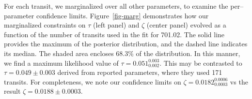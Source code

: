 %
%
For each transit, we marginalized over all other parameters, to
examine the per--parameter confidence limits.  Figure~\ref{fig-marg}
demonstrates how our marginalized constraints on $\tau$ (left panel)
and $\zeta$ (center panel) evolved as a function of the number of
transits used in the fit for 701.02.  The solid line provides the
maximum of the posterior distribution, and the dashed line indicates
its median.  The shaded area encloses 68.3\% of the distribution.  In
this manner, we find a maximum likelihood value of $\tau =
0.051_{0.002}^{0.003}$.  This may be contrasted to $\tau = 0.049 \pm
0.003 $ derived from reported \cite{2013arXiv1304.7387B} parameters,
where they used 171 transits.  For completeness, we note our
confidence limits on $\zeta = 0.0182_{0.0003}^{0.0006}$ vs
the \cite{2013arXiv1304.7387B} result $\zeta = 0.0188 \pm 0.0003$.




